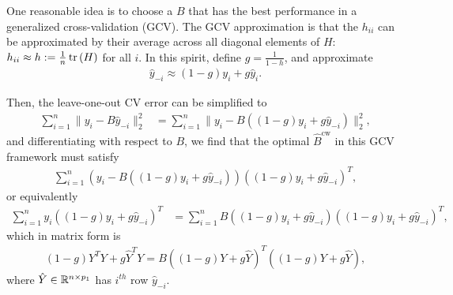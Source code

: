 \documentclass[14pt]{extarticle}
\begin{document}
One reasonable idea is to choose a $B$ that has the best performance in a
generalized cross-validation (GCV). The GCV approximation is that the $h_{ii}$
can be approximated by their average across all diagonal elements of $H$:
$h_{ii} \approx h := \frac{1}{n}\mathop\mathrm{tr}\left(H\right)$ for all $i$. In this spirit,
define $g = \frac{1}{1 - h}$, and approximate
\begin{align*}
  \hat{y}_{-i} \approx \left(1 - g\right)y_{i} + g\hat{y}_{i}.
\end{align*}

Then, the leave-one-out CV error can be simplified to
\begin{align*}
  \sum_{i = 1}^{n}\|y_{i} - B\hat{y}_{-i}\|_{2}^{2} &= \sum_{i =
    1}^{n} \|y_{i} - B\left(\left(1 - g\right)y_{i} +
    g\hat{y}_{-i}\right)\|_{2}^{2},
\end{align*}
and differentiating with respect to $B$, we find that the optimal
$\hat{B}^{\text{cw}}$ in this GCV framework must satisfy
\begin{align*}
\sum_{i = 1}^{n}\left(y_{i} - B\left(\left(1 - g\right)y_{i} +
    g\hat{y}_{-i}\right)\right)\left(\left(1 - g\right)y_{i} +
  g\hat{y}_{-i}\right)^{T},
\end{align*}
or equivalently
\begin{align*}
\sum_{i = 1}^{n} y_{i}\left(\left(1 - g\right)y_{i} +
  g\hat{y}_{-i}\right)^{T} &=  \sum_{i = 1}^{n}B\left(\left(1 -
    g\right)y_{i} + g\hat{y}_{-i}\right)\left(\left(1 - g\right)y_{i}
  +  g\hat{y}_{-i}\right)^{T},
\end{align*}
which in matrix form is
\begin{align}
\left(1 - g\right)Y^{T}Y + g\hat{Y}^{T}Y = B\left(\left(1 - g\right)Y
  + g \hat{Y}\right)^{T}\left(\left(1 - g\right)Y + g \hat{Y}\right), \label{eq:gcv_mat_form}
\end{align}
where $\hat{Y} \in \mathbb{R}^{n \times p_{1}}$ has $i^{th}$ row
$\hat{y}_{-i}$.
\end{document}
